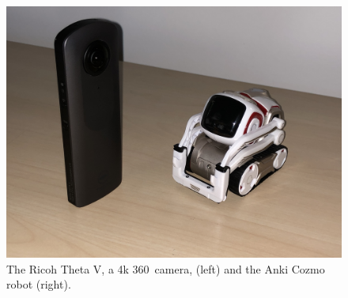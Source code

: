 \documentclass{tufte-handout}
\begin{document}
\begin{figure}
  \centering
  \includegraphics[angle=180,width=\columnwidth]{figures/ricoh-cozmo}
  \caption{\label{fig:cameras} The Ricoh Theta V, a 4k 360\textdegree\ camera,
    (left) and the Anki Cozmo robot (right).}
\end{figure}
\end{document}
